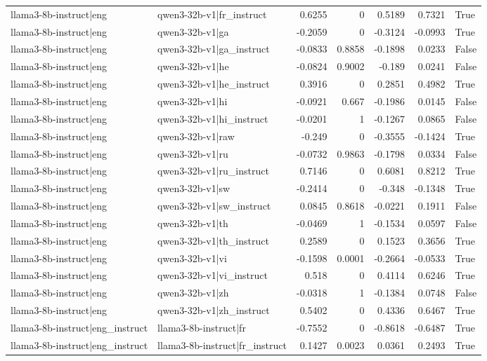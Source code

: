 \begin{table}
\begin{tabular}{l l r r r r l}
llama3-8b-instruct|eng & qwen3-32b-v1|fr_instruct & 0.6255 & 0 & 0.5189 & 0.7321 & True \\
llama3-8b-instruct|eng & qwen3-32b-v1|ga & -0.2059 & 0 & -0.3124 & -0.0993 & True \\
llama3-8b-instruct|eng & qwen3-32b-v1|ga_instruct & -0.0833 & 0.8858 & -0.1898 & 0.0233 & False \\
llama3-8b-instruct|eng & qwen3-32b-v1|he & -0.0824 & 0.9002 & -0.189 & 0.0241 & False \\
llama3-8b-instruct|eng & qwen3-32b-v1|he_instruct & 0.3916 & 0 & 0.2851 & 0.4982 & True \\
llama3-8b-instruct|eng & qwen3-32b-v1|hi & -0.0921 & 0.667 & -0.1986 & 0.0145 & False \\
llama3-8b-instruct|eng & qwen3-32b-v1|hi_instruct & -0.0201 & 1 & -0.1267 & 0.0865 & False \\
llama3-8b-instruct|eng & qwen3-32b-v1|raw & -0.249 & 0 & -0.3555 & -0.1424 & True \\
llama3-8b-instruct|eng & qwen3-32b-v1|ru & -0.0732 & 0.9863 & -0.1798 & 0.0334 & False \\
llama3-8b-instruct|eng & qwen3-32b-v1|ru_instruct & 0.7146 & 0 & 0.6081 & 0.8212 & True \\
llama3-8b-instruct|eng & qwen3-32b-v1|sw & -0.2414 & 0 & -0.348 & -0.1348 & True \\
llama3-8b-instruct|eng & qwen3-32b-v1|sw_instruct & 0.0845 & 0.8618 & -0.0221 & 0.1911 & False \\
llama3-8b-instruct|eng & qwen3-32b-v1|th & -0.0469 & 1 & -0.1534 & 0.0597 & False \\
llama3-8b-instruct|eng & qwen3-32b-v1|th_instruct & 0.2589 & 0 & 0.1523 & 0.3656 & True \\
llama3-8b-instruct|eng & qwen3-32b-v1|vi & -0.1598 & 0.0001 & -0.2664 & -0.0533 & True \\
llama3-8b-instruct|eng & qwen3-32b-v1|vi_instruct & 0.518 & 0 & 0.4114 & 0.6246 & True \\
llama3-8b-instruct|eng & qwen3-32b-v1|zh & -0.0318 & 1 & -0.1384 & 0.0748 & False \\
llama3-8b-instruct|eng & qwen3-32b-v1|zh_instruct & 0.5402 & 0 & 0.4336 & 0.6467 & True \\
llama3-8b-instruct|eng_instruct & llama3-8b-instruct|fr & -0.7552 & 0 & -0.8618 & -0.6487 & True \\
llama3-8b-instruct|eng_instruct & llama3-8b-instruct|fr_instruct & 0.1427 & 0.0023 & 0.0361 & 0.2493 & True \\

\end{tabular}
\end{table}
